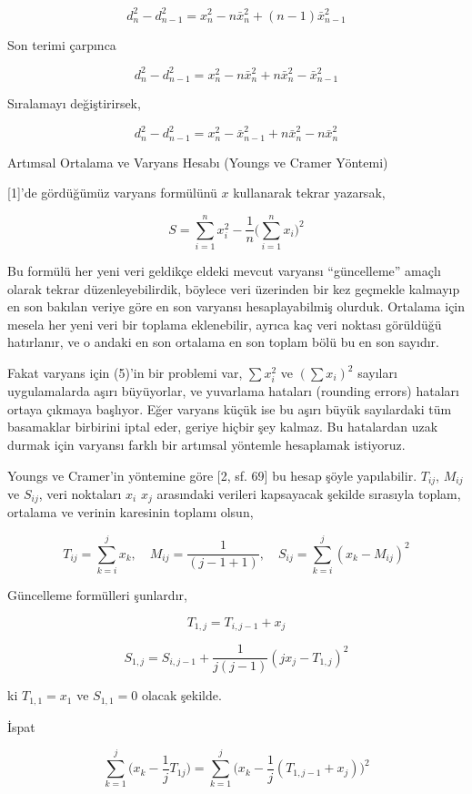 \documentclass[12pt,fleqn]{article}\usepackage{../../common}
\begin{document}
$$
d_n^2 - d_{n-1}^2 = x_n^2 - n \bar{x}_n^2 + (n-1) \bar{x}_{n-1}^2
$$

Son terimi çarpınca

$$
d_n^2 - d_{n-1}^2 = x_n^2 - n \bar{x}_n^2 + n \bar{x}_n^2 - \bar{x}_{n-1}^2
$$

Sıralamayı değiştirirsek,

$$
d_n^2 - d_{n-1}^2 = x_n^2  - \bar{x}_{n-1}^2 + n \bar{x}_n^2 - n \bar{x}_n^2
$$


Artımsal Ortalama ve Varyans Hesabı (Youngs ve Cramer Yöntemi)

[1]'de gördüğümüz varyans formülünü $x$ kullanarak tekrar yazarsak,

$$ 
S = \sum _{i=1}^{n} x_i^2 - \frac{1}{n} \bigg( \sum _{i=1}^{n} x_i \bigg)^2  
$$

Bu formülü her yeni veri geldikçe eldeki mevcut varyansı ``güncelleme''
amaçlı olarak tekrar düzenleyebilirdik, böylece veri üzerinden bir kez
geçmekle kalmayıp en son bakılan veriye göre en son varyansı
hesaplayabilmiş olurduk. Ortalama için mesela her yeni veri bir toplama
eklenebilir, ayrıca kaç veri noktası görüldüğü hatırlanır, ve o andaki en
son ortalama en son toplam bölü bu en son sayıdır. 

Fakat varyans için (5)'in bir problemi var, $\sum x_i^2$ ve $(\sum x_i)^2$
sayıları uygulamalarda aşırı büyüyorlar, ve yuvarlama hataları (rounding
errors) hataları ortaya çıkmaya başlıyor. Eğer varyans küçük ise bu aşırı
büyük sayılardaki tüm basamaklar birbirini iptal eder, geriye hiçbir şey
kalmaz. Bu hatalardan uzak durmak için varyansı farklı bir artımsal
yöntemle hesaplamak istiyoruz.

Youngs ve Cramer'in yöntemine göre [2, sf. 69] bu hesap şöyle
yapılabilir. $T_{ij}$, $M_{ij}$ ve $S_{ij}$, veri noktaları $x_i$ $x_j$
arasındaki verileri kapsayacak şekilde sırasıyla toplam, ortalama ve verinin
karesinin toplamı olsun,

$$ 
T_{ij} = \sum _{k=i}^{j} x_k , \quad  
M_{ij} = \frac{1}{(j-1+1)}, \quad
S_{ij} = \sum _{k=i}^{j} (x_k - M_{ij})^2
$$

Güncelleme formülleri şunlardır, 

$$ T_{1,j} = T_{i,j-1} + x_j$$

$$ S_{1,j} = S_{i,j-1} + \frac{1}{j(j-1)} (jx_j - T_{1,j})^2  $$

ki $T_{1,1} = x_1$ ve $S_{1,1}=0$ olacak şekilde.

İspat

$$ 
\sum _{k=1}^{j} \bigg( x_k - \frac{1}{j} T_{1j} \bigg) = 
\sum _{k=1}^{j} \bigg( x_k - \frac{1}{j} (T_{1,j-1}+x_j)  \bigg)^2
$$
\end{document}
